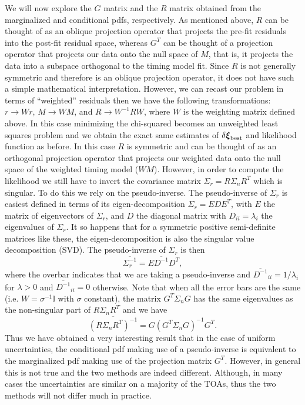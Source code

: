 \documentclass[iop]{emulateapj}
\newcommand{\be}{\begin{equation}}
\newcommand{\ee}{\end{equation}}
\begin{document}
We will now explore the $G$ matrix and the $R$ matrix obtained from the marginalized and conditional pdfs, respectively. As mentioned above, $R$ can be thought of as an oblique projection operator that projects the pre-fit residuals into the post-fit residual space, whereas $G^{T}$ can be thought of a projection operator that projects our data onto the null space of $M$, that is, it projects the data into a subspace orthogonal to the timing model fit. Since $R$ is not generally symmetric and therefore is an oblique projection operator, it does not have such a simple mathematical interpretation. However, we can recast our problem in terms of ``weighted'' residuals then we have the following transformations: $r\rightarrow Wr$, $M\rightarrow WM$, and $R\rightarrow W^{-1}RW$, where $W$ is the weighting matrix defined above. In this case minimizing the chi-squared becomes an unweighted least squares problem and we obtain the exact same estimates of $\delta\boldsymbol{\xi}_{\rm best}$ and  likelihood function as before. In this case $R$ is symmetric and can be thought of as an orthogonal projection operator that projects our weighted data onto the null space of the weighted timing model ($WM$). However, in order to compute the likelihood we still have to invert the covariance matrix $\Sigma_{r}=R\Sigma_{n}R^{T}$ which is singular. To do this we rely on the pseudo-inverse. The pseudo-inverse of $\Sigma_{r}$ is easiest defined in terms of its eigen-decomposition $\Sigma_{r}=EDE^{T}$, with $E$ the matrix of eigenvectors of $\Sigma_{r}$, and $D$ the diagonal matrix with $D_{ii}=\lambda_{i}$ the eigenvalues of $\Sigma_{r}$. It so happens that for a symmetric positive semi-definite matrices like these, the eigen-decomposition is also the singular value decomposition (SVD). The pseudo-inverse of $\Sigma_{r}$ is then
\be
\overline{\Sigma_{r}^{-1}}=E\overline{D^{-1}}D^{T},
\ee  
where the overbar indicates that we are taking a pseudo-inverse and $\overline{D^{-1}}_{ii}=1/\lambda_{i}$ for $\lambda>0$ and $\overline{D^{-1}}_{ii}=0$ otherwise. Note that when all the error bars are the same (i.e. $W=\sigma^{-1}\mathbb{I}$ with $\sigma$ constant), the matrix $G^{T}\Sigma_{n}G$ has the same eigenvalues as the non-singular part of $R\Sigma_{n}R^{T}$ and we have
\be
\overline{(R\Sigma_{n}R^{T})^{-1}}=G(G^{T}\Sigma_{n}G)^{-1}G^{T}.
\ee
Thus we have obtained a very interesting result that in the case of uniform uncertainties, the conditional pdf making use of  a pseudo-inverse is equivalent to the marginalized pdf making use of the projection matrix $G^{T}$. However, in general this is not true and the two methods are indeed different. Although, in many cases the uncertainties are similar on a majority of the TOAs, thus the two methods will not differ much in practice.








\end{document}
